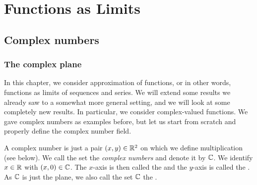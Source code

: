 
\chapter{Functions as Limits} \label{approx:chapter}


\section{Complex numbers}
\label{sec:complexnums}



\subsection{The complex plane}

In this chapter, we consider approximation of functions, or in other words,
functions as limits of sequences and series.
We will extend some results we already saw to a somewhat more
general setting, and we will look at some completely new results.
In particular, we consider complex-valued functions.
We gave complex numbers as examples before, but
let us start from scratch and properly define the complex number field.

A complex number is just a pair $(x,y) \in {\mathbb{R}}^2$ on which we define
multiplication (see below).
We call the set the \emph{complex numbers}
and denote it by ${\mathbb{C}}$.
We identify $x \in {\mathbb{R}}$ with $(x,0) \in {\mathbb{C}}$.
The $x$-axis is then called the \emph{} and the $y$-axis is
called the \emph{}.
As ${\mathbb{C}}$ is just the plane, we also call the set ${\mathbb{C}}$ the
\emph{}.

